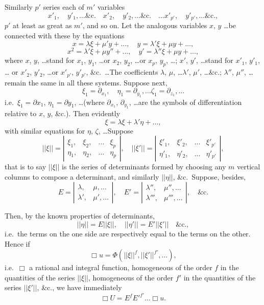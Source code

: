\documentclass[11pt,a4paper]{book}
\begin{document}
Similarly $p'$ series each of $m'$ variables
\[
x'_1, \quad y'_1, \ldots \&\text{c.} \quad x'_2, \quad y'_2, \ldots \&\text{c.} \quad \ldots x'_{p'}, \quad y'_{p'}, \ldots \&\text{c.},
\]
$p'$ at least as great as $m'$, and so on. Let the analogous variables $x$, $y$ \ldots be connected
with these by the equations
\[
x = \lambda \xi + \mu' y + \ldots, \quad y = \lambda' \xi + \mu y + \ldots,
\]
\[
x^2 = \lambda' \xi + \mu y'' + \ldots, \quad y' = \lambda'' \xi + \mu y + \ldots,
\]
where $x$, $y$, \ldots stand for $x_1$, $y_1$, \ldots or $x_2$, $y_2$, \ldots or $x_p$, $y_p$, \ldots; $x'$, $y'$, \ldots stand for $x'_1$, $y'_1$, \ldots
or $x'_2$, $y'_2$, \ldots or $x'_{p'}$, $y'_{p'}$, \&c.\ \ldots The coefficients $\lambda$, $\mu$, \ldots $\lambda'$, $\mu'$, \ldots \&c.; $\lambda''$, $\mu''$, \ldots
remain the same in all these systems. Suppose next,
\[
\xi_1 = \partial_{x_1}, \quad \eta_1 = \partial_{y_1}, \ldots \zeta_1 = \partial_{z_1}, \ldots
\]
i.e.\ $\xi_1 = \partial x_1$, $\eta_1 = \partial y_1$, \ldots (where $\partial_{x_1}$, $\partial_{y_1}$, \ldots are the symbols of differentiation relative to $x$, $y$, \&c.). Then evidently
\[
\xi = \lambda \xi + \lambda' \eta + \ldots,
\]
with similar equations for $\eta$, $\zeta$, \ldots Suppose
\[
||\xi|| = \left|\begin{array}{cccc}
\xi_1, & \xi_2, & \ldots & \xi_p \\
\eta_1, & \eta_2, & \ldots & \eta_p
\end{array}\right|, \quad
||\xi'|| = \left|\begin{array}{cccc}
\xi'_1, & \xi'_2, & \ldots & \xi'_{p'} \\
\eta'_1, & \eta'_2, & \ldots & \eta'_{p'}
\end{array}\right|,
\]
that is to say $||\xi||$ is the series of determinants formed by choosing any $m$ vertical
columns to compose a determinant, and similarly $||\eta||$, \&c.\ Suppose, besides,
\[
E = \left|\begin{array}{cc}
\lambda, & \mu, \ldots \\
\lambda', & \mu', \ldots
\end{array}\right|, \quad
E' = \left|\begin{array}{cc}
\lambda'', & \mu'', \ldots \\
\lambda''', & \mu''', \ldots
\end{array}\right|, \quad \&\text{c.}
\]

Then, by the known properties of determinants,
\[
||\eta|| = E ||\xi||, \quad ||\eta'|| = E' ||\xi'|| \quad \&\text{c.},
\]
i.e.\ the terms on the one side are respectively equal to the terms on the other. Hence if
\[
\Box u = \Phi(||\xi||^f, ||\xi'||^{f'}, \ldots),
\]
i.e.\ $\Box$ a rational and integral function, homogeneous of the order $f$ in the quantities
of the series $||\xi||$, homogeneous of the order $f'$ in the quantities of the series $||\xi'||$,
\&c., we have immediately
\[
\Box U = E^f E'^{f'} \ldots \Box u.
\]
\end{document}
